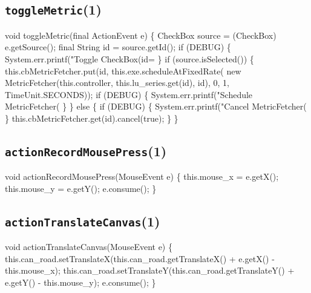 \subsection{\texttt{toggleMetric}(1)}
\nwenddocs{}\endmoddef{}
void toggleMetric(final ActionEvent e) \{
  CheckBox source = (CheckBox) e.getSource();
  final String id = source.getId();
  if (DEBUG) \{
    System.err.printf("Toggle CheckBox(id=%
  \}
  if (source.isSelected()) \{
    this.cbMetricFetcher.put(id, this.exe.scheduleAtFixedRate(
        new MetricFetcher(this.controller, this.lu_series.get(id), id), 0, 1, TimeUnit.SECONDS));
    if (DEBUG) \{
      System.err.printf("Schedule MetricFetcher(%
    \}
  \} else \{
    if (DEBUG) \{
      System.err.printf("Cancel MetricFetcher(%
    \}
    this.cbMetricFetcher.get(id).cancel(true);
  \}
\}
\eatline
{}\nwendcode{}\nwdocspar
\subsection{\texttt{actionRecordMousePress}(1)}
\nwenddocs{}\endmoddef{}
void actionRecordMousePress(MouseEvent e) \{
  this.mouse_x = e.getX();
  this.mouse_y = e.getY();
  e.consume();
\}
\eatline
{}\nwendcode{}\nwdocspar
\subsection{\texttt{actionTranslateCanvas}(1)}
\nwenddocs{}\endmoddef{}
void actionTranslateCanvas(MouseEvent e) \{
  this.can_road.setTranslateX(this.can_road.getTranslateX() + e.getX() - this.mouse_x);
  this.can_road.setTranslateY(this.can_road.getTranslateY() + e.getY() - this.mouse_y);
  e.consume();
\}
\eatline
{}\nwendcode{}\nwdocspar

